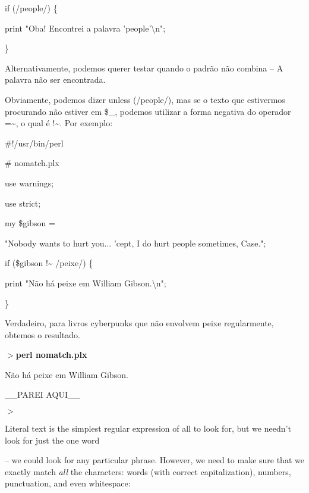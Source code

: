 \documentclass[a4paper,11pt]{book}
\begin{document}
\noindent if (/people/) \{

\noindent print "Oba! Encontrei a palavra 'people'\textbackslash n";

\noindent \}

\noindent 

\noindent Alternativamente, podemos querer testar quando o padrão não combina -- A palavra não ser encontrada.

\noindent Obviamente, podemos dizer unless (/people/), mas se o texto que estivermos procurando não estiver em \$\_, podemos utilizar a forma negativa do operador =\~{}, o qual é !\~{}. Por exemplo:

\noindent 

\noindent \#!/usr/bin/perl

\noindent \# nomatch.plx

\noindent use warnings;

\noindent use strict;

\noindent 

\noindent my \$gibson =

\noindent "Nobody wants to hurt you... 'cept, I do hurt people sometimes, Case.";

\noindent 

\noindent if (\$gibson !\~{} /peixe/) \{

\noindent print "Não há peixe em William Gibson.\textbackslash n";

\noindent \}

\noindent 

\noindent Verdadeiro, para livros cyberpunks que não envolvem peixe regularmente, obtemos o resultado.

\noindent 

\noindent $>$\textbf{perl nomatch.plx}

\noindent Não há peixe em William Gibson.

__PAREI AQUI__

\noindent $>$

\noindent 

\noindent Literal text is the simplest regular expression of all to look for, but we needn't look for just the one word

\noindent -- we could look for any particular phrase. However, we need to make sure that we exactly match \textit{all }the characters:  words (with correct capitalization), numbers, punctuation, and even whitespace:

\noindent 

\noindent 
\end{document}
